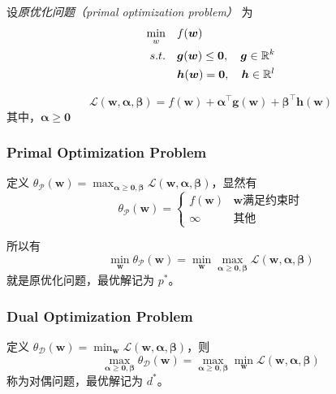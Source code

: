 	设\emph{原优化问题（primal optimization problem）} 为
	\begin{align*}
	\min_w\quad & f(\bm{w}) \\
	s.t. \quad & \bm{g}(\bm{w}) \leq \bm{0}, \quad \bm{g} \in \mathbb{R}^k \\
	& \bm{h}(\bm{w}) = \bm{0}, \quad \bm{h} \in \mathbb{R}^l
	\end{align*}
	
	\begin{df}
		\begin{equation}
		\mathcal{L}(\bm{w}, \bm{\alpha}, \bm{\beta}) = f(\bm{w}) + \bm{\alpha}^\intercal \bm{g}(\bm{w}) + \bm{\beta}^\intercal \bm{h}(\bm{w})
		\end{equation}
		其中，$ \bm{\alpha} \geq \bm{0} $
	\end{df}
	
	\subsubsection{Primal Optimization Problem}
	定义 $ \theta_\mathcal{P}(\bm{w}) = \max_{\bm{\alpha} \geq \bm{0}, \bm{\beta}}{\mathcal{L}(\bm{w}, \bm{\alpha}, \bm{\beta})} $，显然有
	\begin{equation*}
	\theta_\mathcal{P}(\bm{w}) = 
	\begin{cases}
	f(\bm{w}) & \bm{w} \text{满足约束时} \\
	\infty & \text{其他}
	\end{cases}
	\end{equation*}
	
	所以有
	\begin{equation}
	\min_{\bm{w}}{\theta_\mathcal{P}(\bm{w})} = \min_{\bm{w}}{\max_{\bm{\alpha} \geq \bm{0}, \bm{\beta}}{\mathcal{L}(\bm{w}, \bm{\alpha}, \bm{\beta})}}
	\end{equation}
	就是原优化问题，最优解记为 $ p^* $。
	
	\subsubsection{Dual Optimization Problem}
	定义 $ \theta_\mathcal{D}(\bm{w}) = \min_{\bm{w}}{\mathcal{L}(\bm{w}, \bm{\alpha}, \bm{\beta})} $，则
	\begin{equation}
	\max_{\bm{\alpha} \geq \bm{0}, \bm{\beta}}{\theta_\mathcal{D}(\bm{w})} = \max_{\bm{\alpha} \geq \bm{0}, \bm{\beta}}\min_{\bm{w}}{\mathcal{L}(\bm{w}, \bm{\alpha}, \bm{\beta})} \label{dual-opt-problem}
	\end{equation}
	称为对偶问题，最优解记为 $ d^* $。
	
